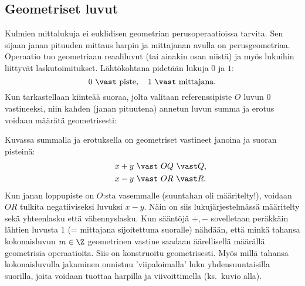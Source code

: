 \subsection{Geometriset luvut}
%

Kulmien mittalukuja ei euklidisen geometrian perusoperaatioissa tarvita. Sen sijaan janan 
pituuden mittaus harpin ja mittajanan avulla on perusgeometriaa. Operaatio tuo geometriaan 
reaaliluvut (tai ainakin osan niistä) ja myös lukuihin liittyvät laskutoimitukset.
Lähtökohtana pidetään lukuja $0$ ja $1$:
\[
0\ \vast\ \text{piste}, \quad 1\ \vast\ \text{mittajana}.
\]
Kun tarkastellaan kiinteää suoraa, jolta valitaan referenssipiste $O$ luvun $0$ vastineeksi, 
niin kahden (janan pituutena) annetun luvun summa ja erotus voidaan määrätä geometrisesti:
\begin{figure}[htb]
\begin{center}
\end{center}
\end{figure}

Kuvassa summalla ja erotuksella on geometriset vastineet janoina ja suoran pisteinä:
\begin{align*}
\qquad &x+y\ \vast\ OQ\ \vast Q,  \\
\qquad &x-y\ \vast\ OR\ \vast R.
\end{align*}
Kun janan loppupiste on $O$:sta vasemmalle (suuntahan oli määritelty!), voidaan $OR$ tulkita 
negatiiviseksi luvuksi $x-y$. Näin on siis lukujärjestelmässä määritelty sekä yhteenlasku että
vähennyslasku. Kun sääntöjä $+,-$ sovelletaan peräkkäin lähtien luvusta 1 (= mittajana
sijoitettuna suoralle) nähdään, että minkä tahansa kokonaisluvun $m\in{\Z}$ geometrinen vastine
saadaan äärellisellä määrällä geometrisia operaatioita. Siis {\Z} on konstruoitu geometrisesti.
Myös millä tahansa kokonaisluvulla jakaminen onnistuu 'viipaloimalla' luku yhdensuuntaisilla 
suorilla, joita voidaan  tuottaa harpilla ja viivoittimella (ks.\ kuvio alla).
\begin{figure}[htb]
\begin{center}
\end{center}
\end{figure}

\pagebreak

